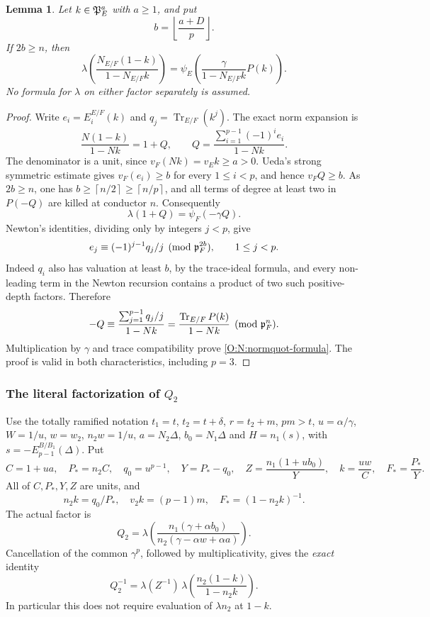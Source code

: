 \documentclass[11pt]{amsart}
\newtheorem{lemma}[theorem]{Lemma}
\theoremstyle{definition}
\theoremstyle{remark}
\newcommand{\Tr}{\operatorname{Tr}}
\newcommand{\ceil}[1]{\left\lceil #1\right\rceil}
\newcommand{\floor}[1]{\left\lfloor #1\right\rfloor}
\begin{document}
\begin{lemma}\label{O:N:normquot}
Let $k\in\mathfrak P_E^a$ with $a\ge1$, and put
\[
 b=\floor{\frac{a+D}{p}}.
\]
If $2b\ge n$, then
\begin{equation}\label{O:N:normquot-formula}
 \lambda\!\left(\frac{N_{E/F}(1-k)}{1-N_{E/F}k}\right)
 =\psi_E\!\left(\frac{\gamma}{1-N_{E/F}k}P(k)\right).
\end{equation}
No formula for $\lambda$ on either factor separately is assumed.
\end{lemma}
\begin{proof}
Write $e_i=E_i^{E/F}(k)$ and $q_j=\Tr_{E/F}(k^j)$.
The exact norm expansion is
\[
 \frac{N(1-k)}{1-Nk}
 =1+Q,\qquad Q=\frac{\sum_{i=1}^{p-1}(-1)^i e_i}{1-Nk}.
\]
The denominator is a unit, since $v_F(Nk)=v_Ek\ge a>0$.
Ueda's strong symmetric estimate gives $v_F(e_i)\ge b$ for every
$1\le i<p$, and hence $v_FQ\ge b$.
As $2b\ge n$, one has $b\ge\ceil{n/2}\ge\ceil{n/p}$, and all
terms of degree at least two in $P(-Q)$ are killed at conductor $n$.
Consequently
\[
 \lambda(1+Q)=\psi_F(-\gamma Q).
\]
Newton's identities, dividing only by integers $j<p$, give
\[
 e_j\equiv(-1)^{j-1}q_j/j\pmod{\mathfrak p_F^{2b}},\qquad 1\le j<p.
\]
Indeed $q_i$ also has valuation at least $b$, by the trace-ideal formula,
and every non-leading term in the Newton recursion contains a product of
two such positive-depth factors. Therefore
\[
 -Q\equiv\frac{\sum_{j=1}^{p-1}q_j/j}{1-Nk}
       =\frac{\Tr_{E/F}P(k)}{1-Nk}\pmod{\pp_F^n}.
\]
Multiplication by $\gamma$ and trace compatibility prove
\eqref{O:N:normquot-formula}. The proof is valid in both characteristics,
including $p=3$.
\end{proof}

\subsubsection*{\texorpdfstring{The literal factorization of $Q_2$}{The literal factorization of Q2}}
Use the totally ramified notation $t_1=t$, $t_2=t+\delta$, $r=t_2+m$,
$pm>t$, $u=\alpha/\gamma$, $W=1/u$, $w=w_2$, $n_2w=1/u$,
$a=N_2\Delta$, $b_0=N_1\Delta$ and $H=n_1(s)$, with
$s=-E_{p-1}^{B/B_1}(\Delta)$. Put
\[
 C=1+ua,\quad P_*=n_2C,\quad q_0=u^{p-1},\quad
 Y=P_*-q_0,\quad Z=\frac{n_1(1+ub_0)}{Y},\quad
 k=\frac{uw}{C},\quad F_*=\frac{P_*}{Y}.
\]
All of $C,P_*,Y,Z$ are units, and
\[
 n_2k=q_0/P_*,\quad v_2k=(p-1)m,\quad F_*=(1-n_2k)^{-1}.
\]
The actual factor is
\[
 Q_2=\lambda\!\left(\frac{n_1(\gamma+\alpha b_0)}
                           {n_2(\gamma-\alpha w+\alpha a)}\right).
\]
Cancellation of the common $\gamma^p$, followed by multiplicativity,
gives the \emph{exact} identity
\begin{equation}\label{O:N:exactfactor}
 Q_2^{-1}=\lambda(Z^{-1})\,
       \lambda\!\left(\frac{n_2(1-k)}{1-n_2k}\right).
\end{equation}
In particular this does not require evaluation of $\lambda n_2$ at $1-k$.
\end{document}
